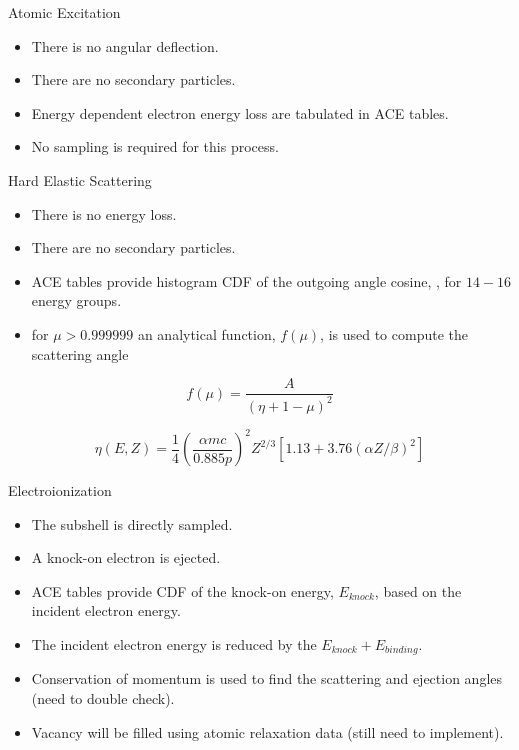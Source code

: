 \documentclass{beamer}
\begin{document}
\begin{frame}{Atomic Excitation}

  \begin{itemize}
    \item There is no angular deflection.
    \item There are no secondary particles.
    \item Energy dependent electron energy loss are tabulated in ACE tables.
    \item No sampling is required for this process.   
  \end{itemize}

\end{frame}

\begin{frame}{Hard Elastic Scattering}
  
  \begin{itemize}
    \item There is no energy loss.
    \item There are no secondary particles.
    \item ACE tables provide histogram CDF of the outgoing angle cosine, \textmu, 
            for $14-16$ energy groups.
    \item for $\mu > 0.999999$ an analytical function, $f(\mu)$, is used to 
            compute the scattering angle
  \end{itemize}

  \begin{equation*}
    f(\mu) = \frac{A}{(\eta + 1 - \mu)^2}
  \end{equation*}

  \begin{equation*}
    \eta(E,Z) = \frac{1}{4}\left(\frac{\alpha mc}{0.885p}\right)^2 Z^{2/3}[1.13+3.76(\alpha Z/\beta)^2]
  \end{equation*}


\end{frame}

\begin{frame}{Electroionization}
  
  \begin{itemize}
    \item The subshell is directly sampled.
    \item A knock-on electron is ejected.
    \item ACE tables provide CDF of the knock-on energy, $E_{knock}$, based on the incident electron energy.
    \item The incident electron energy is reduced by the $E_{knock} + E_{binding}$.
    \item Conservation of momentum is used to find the scattering and ejection angles (need to double check).
    \item Vacancy will be filled using atomic relaxation data (still need to implement). 
  \end{itemize}

\end{frame}
\end{document}
